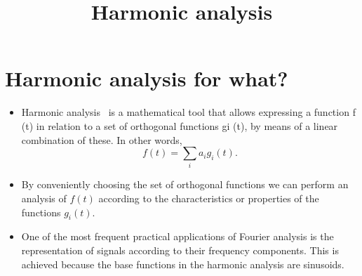 \title{Harmonic analysis}

\maketitle
\tableofcontents


\section{Harmonic analysis for what?}
\begin{itemize}
\item Harmonic analysis~\cite{Lathi} is a mathematical tool that
  allows expressing a function f (t) in relation to a set of
  orthogonal functions gi (t), by means of a linear combination of
  these. In other words,
  $$
  f(t) = \sum_i a_ig_i(t).
  $$
\item By conveniently choosing the set of orthogonal functions we can
  perform an analysis of $f(t)$ according to the characteristics or
  properties of the functions $g_i(t)$.
\item One of the most frequent practical applications of Fourier
  analysis is the representation of signals according to their
  frequency components. This is achieved because the base functions in
  the harmonic analysis are sinusoids.
\end{itemize}

